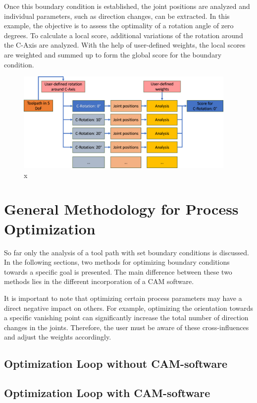 Once this boundary condition is established, the joint positions are analyzed and individual parameters, such as direction changes, can be extracted. In this example, the objective is to assess the optimality of a rotation angle of zero degrees.
To calculate a local score, additional variations of the rotation around the C-Axis are analyzed. With the help of user-defined weights, the local scores are weighted and summed up to form the global score for the boundary condition.


\begin{figure}[H]
	\centerline{\includegraphics[width=0.95\textwidth]{figures/grob.png}}
	\caption{x}
	\label{grob}
\end{figure}
















\newpage
\section{General Methodology for Process Optimization}
So far only the analysis of a tool path with set boundary conditions is discussed. In the following sections, two methods for optimizing boundary conditions towards a specific goal is presented. The main difference between these two methods lies in the different incorporation of a CAM software.

It is important to note that optimizing certain process parameters may have a direct negative impact on others. For example, optimizing the orientation towards a specific vanishing point can significantly increase the total number of direction changes in the joints. Therefore, the user must be aware of these cross-influences and adjust the weights accordingly.

\subsection{Optimization Loop without CAM-software}
\subsection{Optimization Loop with CAM-software}